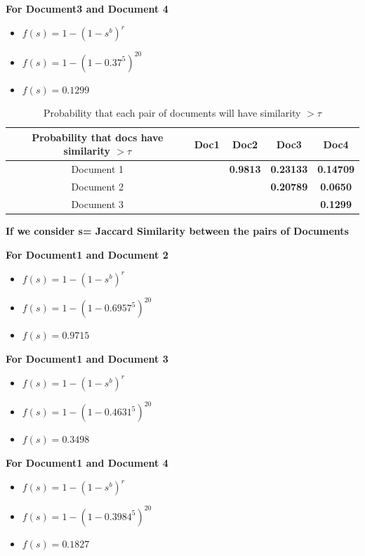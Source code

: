 \documentclass[11pt]{article}
\begin{document}
\begin{itemize}
\textbf{For Document3 and Document 4}
\begin{itemize}
	\item[] $f(s)=1-(1-s^{b})^{r}$
	\item[] $f(s)=1-(1-0.37^{5})^{20}$
	\item[] $\boxed{f(s)=0.1299}$\\
\end{itemize}



\begin{table}[h]
	\centering
	\begin{tabular}{|c|c|c|c|c|}
		\hline
		\textbf{Probability that docs have similarity  $ > \tau$}  & \textbf{Doc1} & \textbf{Doc2} & \textbf{Doc3} & \textbf{Doc4}  \\
		\hline
		Document 1&    &  \textbf{0.9813}   &  \textbf{0.23133}     &  \textbf{0.14709}  \\
		\hline
		Document 2&      &      &  \textbf{0.20789}    &  \textbf{0.0650}    \\
		\hline
		Document 3&      &     &    &  \textbf{0.1299}   \\
		\hline
	\end{tabular}
	\caption{Probability that each pair of documents will have similarity $ > \tau $}
	\label{t2}
\end{table}


\textbf{ If we consider s= Jaccard Similarity between the pairs of Documents}

\textbf{For Document1 and Document 2}
\begin{itemize}
	\item[] $f(s)=1-(1-s^{b})^{r}$
	\item[] $f(s)=1-(1-0.6957^{5})^{20}$
	\item[] $\boxed{f(s)=0.9715}$
\end{itemize}

\textbf{For Document1 and Document 3}
\begin{itemize}
	\item[] $f(s)=1-(1-s^{b})^{r}$
	\item[] $f(s)=1-(1-0.4631^{5})^{20}$
	\item[] $\boxed{f(s)=0.3498}$\\
\end{itemize}

\textbf{For Document1 and Document 4}
\begin{itemize}
	\item[] $f(s)=1-(1-s^{b})^{r}$
	\item[] $f(s)=1-(1-0.3984^{5})^{20}$
	\item[] $\boxed{f(s)=0.1827}$\\
\end{itemize}


\end{itemize}
\end{document}
